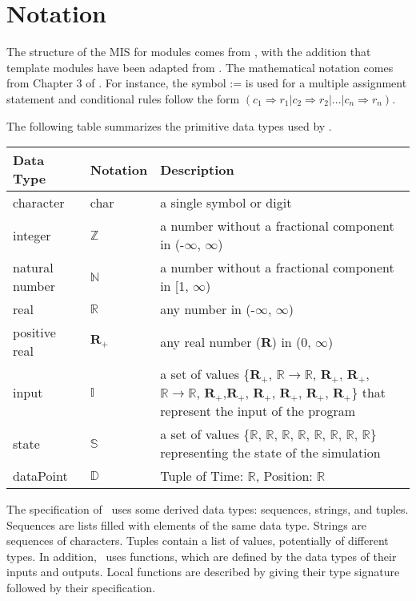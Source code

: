 \documentclass[12pt, titlepage]{article}
\begin{document}
\section{Notation}

The structure of the MIS for modules comes from \citet{HoffmanAndStrooper1995},
with the addition that template modules have been adapted from
\cite{GhezziEtAl2003}.  The mathematical notation comes from Chapter 3 of
\citet{HoffmanAndStrooper1995}.  For instance, the symbol := is used for a
multiple assignment statement and conditional rules follow the form $(c_1
\Rightarrow r_1 | c_2 \Rightarrow r_2 | ... | c_n \Rightarrow r_n )$.

The following table summarizes the primitive data types used by \progname. 

\begin{center}
\renewcommand{\arraystretch}{1.2}
\noindent 
\begin{tabular}{l l p{7.5cm}} 
\toprule 
\textbf{Data Type} & \textbf{Notation} & \textbf{Description}\\ 
\midrule
character & char & a single symbol or digit\\
integer & $\mathbb{Z}$ & a number without a fractional component in (-$\infty$, $\infty$) \\
natural number & $\mathbb{N}$ & a number without a fractional component in [1, $\infty$) \\
real & $\mathbb{R}$ & any number in (-$\infty$, $\infty$)\\
positive real & $\mathbf{R}_{+}$ & any real number ($\mathbf{R}$) in ($0$, $\infty$) \\
input & $\mathbb{I}$ & a set of values \{$\mathbf{R}_{+}$, $\mathbb{R} \rightarrow \mathbb{R}$, $\mathbf{R}_{+}$, $\mathbf{R}_{+}$, $\mathbb{R} \rightarrow \mathbb{R}$, $\mathbf{R}_{+}$,$\mathbf{R}_{+}$, $\mathbf{R}_{+}$, $\mathbf{R}_{+}$, $\mathbf{R}_{+}$, $\mathbf{R}_{+}$\} that represent the input of the program \\
state & $\mathbb{S}$ & a set of values \{$\mathbb{R}$, $\mathbb{R}$, $\mathbb{R}$, $\mathbb{R}$, $\mathbb{R}$, $\mathbb{R}$, $\mathbb{R}$, $\mathbb{R}$\} representing the state of the simulation \\
dataPoint & $\mathbb{D}$ & Tuple of Time: $\mathbb{R}$, Position: $\mathbb{R}$\\
\end{tabular} 
\end{center}

\noindent
The specification of \progname \ uses some derived data types: sequences, strings, and
tuples. Sequences are lists filled with elements of the same data type. Strings
are sequences of characters. Tuples contain a list of values, potentially of
different types. In addition, \progname \ uses functions, which
are defined by the data types of their inputs and outputs. Local functions are
described by giving their type signature followed by their specification.
\end{document}
